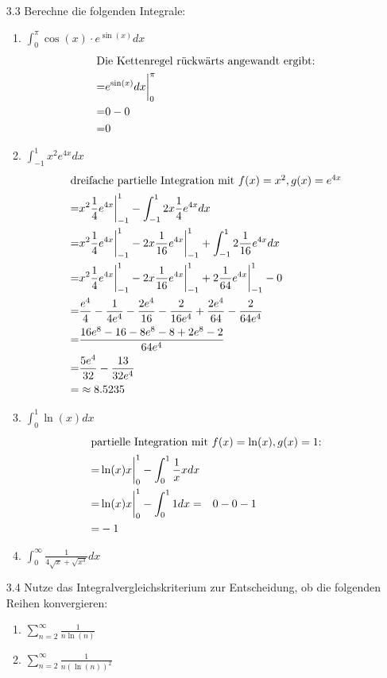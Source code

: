 \documentclass{HM}
\begin{document}
	\begin{enumerate}
		\item[3.3] Berechne die folgenden Integrale:
		\begin{enumerate}
			\item $\int_0^\pi\cos(x)\cdot e^{\sin(x)}dx$
			\begin{align*}
				\intertext{Die Kettenregel rückwärts angewandt ergibt:}
				=&e^{\sin(x)}dx\biggr|_0^\pi\\
				=&0-0\\
				=&0
			\end{align*}
			\item $\int_{-1}^1x^2e^{4x}dx$
			\begin{align*}
				\intertext{dreifache partielle Integration mit $f(x)=x^2, g(x)=e^{4x}$}
				=&x^2\frac{1}{4}e^{4x}\biggr|_{-1}^1 - \int_{-1}^12x\frac{1}{4}e^{4x}dx\\
				=&x^2\frac{1}{4}e^{4x}\biggr|_{-1}^1 - 2x\frac{1}{16}e^{4x}\biggr|_{-1}^1 + \int_{-1}^12\frac{1}{16}e^{4x}dx\\
				=&x^2\frac{1}{4}e^{4x}\biggr|_{-1}^1 - 2x\frac{1}{16}e^{4x}\biggr|_{-1}^1 + 2\frac{1}{64}e^{4x}\biggr|_{-1}^1-0\\
				=&\frac{e^4}{4}-\frac{1}{4e^4}-\frac{2e^4}{16}-\frac{2}{16e^4}+\frac{2e^4}{64}-\frac{2}{64e^4}\\
				=&\frac{16e^8-16-8e^8-8+2e^8-2}{64e^4}	\\
				=&\frac{5e^4}{32}-\frac{13}{32e^4}\\
				=&\approx 8.5235
			\end{align*}
			\item $\int_0^1\ln(x)dx$
			\begin{align*}
				\intertext{partielle Integration mit $f(x)=\ln(x), g(x)=1$:}
				=&\ln(x)x\biggr|_0^1 - \int_0^1\frac{1}{x}xdx\\
				=&\ln(x)x\biggr|_0^1 - \int_0^11dx
				=&0-0-1\\
				=&-1
			\end{align*}
			\item $\int_0^\infty\frac{1}{4\sqrt{x}+\sqrt{x^3}}dx$
		\end{enumerate}
		
		\item[3.4] Nutze das Integralvergleichskriterium zur Entscheidung, ob die folgenden Reihen konvergieren:
		\begin{enumerate}
			\item $\sum\limits_{n=2}^\infty\frac{1}{n\ln(n)}$
			\item $\sum\limits_{n=2}^\infty\frac{1}{n(\ln(n))^2}$
		\end{enumerate}
		

\end{enumerate}
\end{document}
